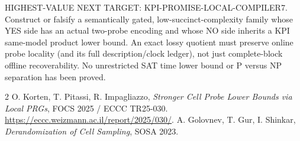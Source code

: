 \documentclass[11pt]{article}
\begin{document}
HIGHEST-VALUE NEXT TARGET: KPI-PROMISE-LOCAL-COMPILER7. Construct or falsify a semantically gated, low-succinct-complexity family whose YES side has an actual two-probe encoding and whose NO side inherits a KPI same-model product lower bound. An exact lossy quotient must preserve online probe locality (and its full description/clock ledger), not just complete-block offline recoverability. No unrestricted SAT time lower bound or P versus NP separation has been proved.

\begin{thebibliography}{2}
 O. Korten, T. Pitassi, R. Impagliazzo, \emph{Stronger Cell Probe Lower Bounds via Local PRGs}, FOCS 2025 / ECCC TR25-030. \url{https://eccc.weizmann.ac.il/report/2025/030/}.
 A. Golovnev, T. Gur, I. Shinkar, \emph{Derandomization of Cell Sampling}, SOSA 2023.
\end{thebibliography}
\end{document}
